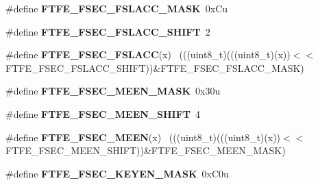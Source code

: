 \begin{DoxyCompactItemize}
\item 
\hypertarget{group___f_t_f_e___register___masks_gabb6e4b7f5515626f6e19931ee6812e84}{}\#define {\bfseries F\+T\+F\+E\+\_\+\+F\+S\+E\+C\+\_\+\+F\+S\+L\+A\+C\+C\+\_\+\+M\+A\+S\+K}~0x\+Cu\label{group___f_t_f_e___register___masks_gabb6e4b7f5515626f6e19931ee6812e84}

\item 
\hypertarget{group___f_t_f_e___register___masks_ga7e242828689c59247ae5c4e78dbea147}{}\#define {\bfseries F\+T\+F\+E\+\_\+\+F\+S\+E\+C\+\_\+\+F\+S\+L\+A\+C\+C\+\_\+\+S\+H\+I\+F\+T}~2\label{group___f_t_f_e___register___masks_ga7e242828689c59247ae5c4e78dbea147}

\item 
\hypertarget{group___f_t_f_e___register___masks_ga6598ef97deee9538793f77502fe2cfe6}{}\#define {\bfseries F\+T\+F\+E\+\_\+\+F\+S\+E\+C\+\_\+\+F\+S\+L\+A\+C\+C}(x)                                        ~(((uint8\+\_\+t)(((uint8\+\_\+t)(x))$<$$<$F\+T\+F\+E\+\_\+\+F\+S\+E\+C\+\_\+\+F\+S\+L\+A\+C\+C\+\_\+\+S\+H\+I\+F\+T))\&F\+T\+F\+E\+\_\+\+F\+S\+E\+C\+\_\+\+F\+S\+L\+A\+C\+C\+\_\+\+M\+A\+S\+K)\label{group___f_t_f_e___register___masks_ga6598ef97deee9538793f77502fe2cfe6}

\item 
\hypertarget{group___f_t_f_e___register___masks_ga1eb5ff8901b0e60cc847e11e66096931}{}\#define {\bfseries F\+T\+F\+E\+\_\+\+F\+S\+E\+C\+\_\+\+M\+E\+E\+N\+\_\+\+M\+A\+S\+K}~0x30u\label{group___f_t_f_e___register___masks_ga1eb5ff8901b0e60cc847e11e66096931}

\item 
\hypertarget{group___f_t_f_e___register___masks_gabcb6c110f2c3a61788237eb32991610d}{}\#define {\bfseries F\+T\+F\+E\+\_\+\+F\+S\+E\+C\+\_\+\+M\+E\+E\+N\+\_\+\+S\+H\+I\+F\+T}~4\label{group___f_t_f_e___register___masks_gabcb6c110f2c3a61788237eb32991610d}

\item 
\hypertarget{group___f_t_f_e___register___masks_ga311bf982286a4c67c25fb0dd985781bf}{}\#define {\bfseries F\+T\+F\+E\+\_\+\+F\+S\+E\+C\+\_\+\+M\+E\+E\+N}(x)                                            ~(((uint8\+\_\+t)(((uint8\+\_\+t)(x))$<$$<$F\+T\+F\+E\+\_\+\+F\+S\+E\+C\+\_\+\+M\+E\+E\+N\+\_\+\+S\+H\+I\+F\+T))\&F\+T\+F\+E\+\_\+\+F\+S\+E\+C\+\_\+\+M\+E\+E\+N\+\_\+\+M\+A\+S\+K)\label{group___f_t_f_e___register___masks_ga311bf982286a4c67c25fb0dd985781bf}

\item 
\hypertarget{group___f_t_f_e___register___masks_ga7417ca1039c57d3a275bef88e0cfe6f1}{}\#define {\bfseries F\+T\+F\+E\+\_\+\+F\+S\+E\+C\+\_\+\+K\+E\+Y\+E\+N\+\_\+\+M\+A\+S\+K}~0x\+C0u\label{group___f_t_f_e___register___masks_ga7417ca1039c57d3a275bef88e0cfe6f1}


\end{DoxyCompactItemize}
